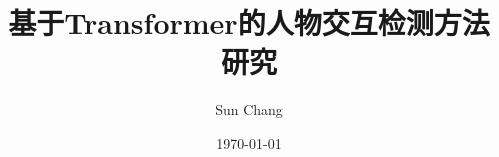 \documentclass[UTF8, twoside, 12pt]{ctexart}
\numberwithin{equation}{section}
\begin{document}
\title{基于Transformer的人物交互检测方法研究}
\author{Sun Chang}
\date{\today}

\newcommand{\authorname}{Your name}
\newcommand{\school}{Your school}
\newcommand{\major}{Your major}
\newcommand{\studentid}{Your student id}
\newcommand{\tutor}{Your tutor}
\newcommand{\submitdate}{2024年\ 05月\ 00日}












\printbibliography[title={参考文献}]
\newpage


\end{document}
